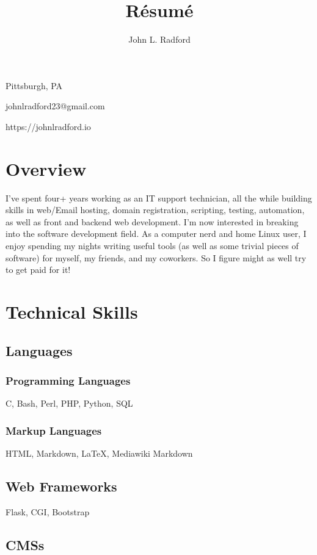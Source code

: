 \documentclass{article}
\makeatletter
\renewcommand{\maketitle}{
\begin{flushright}
{\huge\bfseries
\theauthor}

\vspace{.25em}
Pittsburgh, PA

\vspace{.25em}
johnlradford23@gmail.com

\vspace{.25em}
https://johnlradford.io 

\end{flushright}
}
\makeatother
\begin{document}
\title{R\'esum\'e}
\author{John L. Radford}

\maketitle

\section{Overview}

I've spent four+ years working as an IT support technician, all the while
building skills in web/Email hosting, domain registration, scripting, testing,
automation, as well as front and backend web development. I'm now interested in
breaking into the software development field. As a computer nerd and home Linux
user, I enjoy spending my nights writing useful tools (as well as some trivial
pieces of software) for myself, my friends, and my coworkers. So I figure might
as well try to get paid for it!

\section{Technical Skills}

\subsection{Languages}

\subsubsection{Programming Languages}

C, Bash, Perl, PHP, Python, SQL

\subsubsection{Markup Languages}

HTML, Markdown, {\LaTeX}, Mediawiki Markdown

\subsection{Web Frameworks}

Flask, CGI, Bootstrap

\subsection{CMSs}
\end{document}
